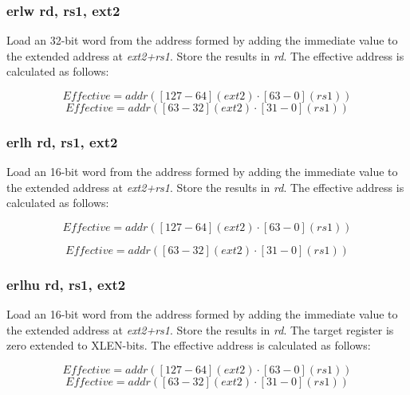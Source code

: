 \documentclass{article}
\begin{document}
\subsubsection{erlw rd, rs1, ext2}

Load an 32-bit word from the address formed by adding the immediate value to the 
extended address at \textit{ext2+rs1}.  Store the results in \textit{rd}.  
The effective address is calculated as follows:

\begin{equation}
Effective = addr([127-64](ext2) \cdot [63-0](rs1))
\end{equation}
\begin{equation}
Effective = addr([63-32](ext2) \cdot [31-0](rs1))
\end{equation}

\subsubsection{erlh rd, rs1, ext2}

Load an 16-bit word from the address formed by adding the immediate value to the 
extended address at \textit{ext2+rs1}.  Store the results in \textit{rd}.  
The effective address is calculated as follows:

\begin{equation}
Effective = addr([127-64](ext2) \cdot [63-0](rs1))
\end{equation}

\begin{equation}
Effective = addr([63-32](ext2) \cdot [31-0](rs1))
\end{equation}

\subsubsection{erlhu rd, rs1, ext2}

Load an 16-bit word from the address formed by adding the immediate value to the 
extended address at \textit{ext2+rs1}.  Store the results in \textit{rd}.  
 The target register is zero extended to XLEN-bits.  The effective 
address is calculated as follows:

\begin{equation}
Effective = addr([127-64](ext2) \cdot [63-0](rs1))
\end{equation}
\begin{equation}
Effective = addr([63-32](ext2) \cdot [31-0](rs1))
\end{equation}
\end{document}

